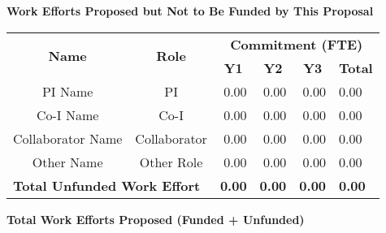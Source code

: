 \documentclass[oneside,12pt]{article}
\begin{document}
    \begin{center}
        \textbf{Work Efforts Proposed but Not to Be Funded by This Proposal}
        \vspace{-1em}
    \end{center}

    \begin{table}[h]
        \centering
        \begin{tabular}{|c|c|r|r|r|l|}
            \hline
            \multirow{2}{*}{\textbf{Name}} & \multirow{2}{*}{\textbf{Role}} & \multicolumn{4}{c|}{\textbf{Commitment (FTE)}} \\
            \cline{3-6}
            & & \multicolumn{1}{c|}{\textbf{Y1}} & \multicolumn{1}{c|}{\textbf{Y2}} & \multicolumn{1}{c|}{\textbf{Y3}} & \multicolumn{1}{c|}{\textbf{Total}} \\
            \hline
            PI Name           & PI           & 0.00 & 0.00 & 0.00 & 0.00 \\
            Co-I Name         & Co-I         & 0.00 & 0.00 & 0.00 & 0.00 \\
            Collaborator Name & Collaborator & 0.00 & 0.00 & 0.00 & 0.00 \\
            Other Name        & Other Role   & 0.00 & 0.00 & 0.00 & 0.00 \\
            \hline
            \multicolumn{2}{|l|}{\textbf{Total Unfunded Work Effort}} & \textbf{0.00} & \textbf{0.00} & \textbf{0.00} & \textbf{0.00} \\
            \hline
        \end{tabular}
    \end{table}

    \vspace{1em}

    \begin{center}
        \textbf{Total Work Efforts Proposed (Funded + Unfunded)}
        \vspace{-1em}
    \end{center}
\end{document}
